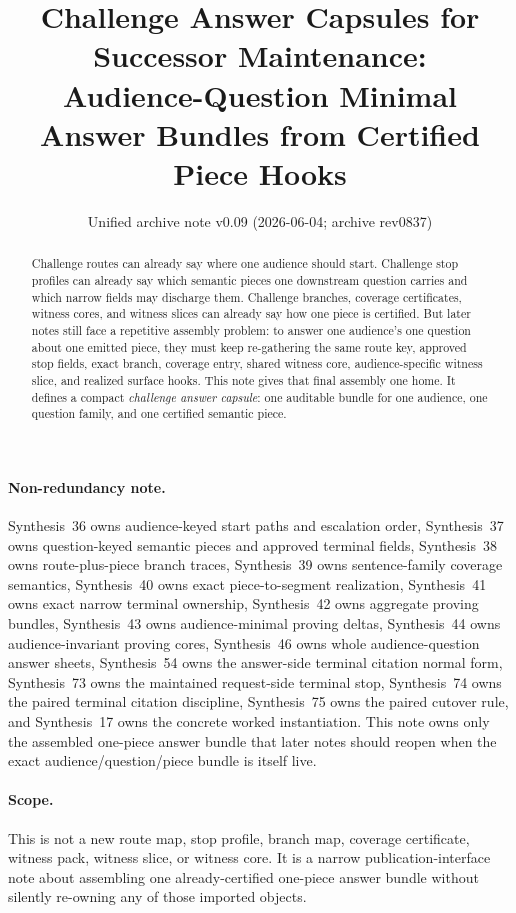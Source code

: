 \documentclass[11pt]{article}
\title{Challenge Answer Capsules for Successor Maintenance:\\[0.5ex]
\large Audience-Question Minimal Answer Bundles from Certified Piece Hooks}
\author{}
\date{Unified archive note v0.09 (2026-06-04; archive rev0837)}
\begin{document}
\maketitle

\begin{abstract}
Challenge routes can already say where one audience should start.
Challenge stop profiles can already say which semantic pieces one downstream question carries and which narrow fields may discharge them.
Challenge branches, coverage certificates, witness cores, and witness slices can already say how one piece is certified.
But later notes still face a repetitive assembly problem: to answer one audience's one question about one emitted piece, they must keep re-gathering the same route key, approved stop fields, exact branch, coverage entry, shared witness core, audience-specific witness slice, and realized surface hooks.
This note gives that final assembly one home.
It defines a compact \emph{challenge answer capsule}: one auditable bundle for one audience, one question family, and one certified semantic piece.
\end{abstract}

\paragraph{Non-redundancy note.}
Synthesis~36 owns audience-keyed start paths and escalation order, Synthesis~37 owns question-keyed semantic pieces and approved terminal fields, Synthesis~38 owns route-plus-piece branch traces, Synthesis~39 owns sentence-family coverage semantics, Synthesis~40 owns exact piece-to-segment realization, Synthesis~41 owns exact narrow terminal ownership, Synthesis~42 owns aggregate proving bundles, Synthesis~43 owns audience-minimal proving deltas, Synthesis~44 owns audience-invariant proving cores, Synthesis~46 owns whole audience-question answer sheets, Synthesis~54 owns the answer-side terminal citation normal form, Synthesis~73 owns the maintained request-side terminal stop, Synthesis~74 owns the paired terminal citation discipline, Synthesis~75 owns the paired cutover rule, and Synthesis~17 owns the concrete worked instantiation.
This note owns only the assembled one-piece answer bundle that later notes should reopen when the exact audience/question/piece bundle is itself live.

\paragraph{Scope.}
This is not a new route map, stop profile, branch map, coverage certificate, witness pack, witness slice, or witness core.
It is a narrow publication-interface note about assembling one already-certified one-piece answer bundle without silently re-owning any of those imported objects.
\end{document}
